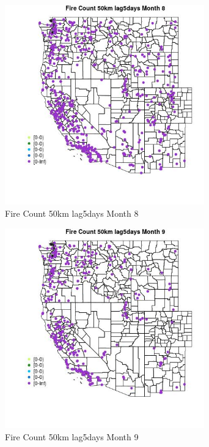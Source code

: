 \begin{figure} 
\centering  
\includegraphics[width=0.77\textwidth]{Code_Outputs/Report_ML_input_PM25_Step4_part_e_de_duplicated_aves_compiled_2019-05-18wNAs_MapObsMo8Fire_Count_50km_lag5days.jpg} 
\caption{\label{fig:Report_ML_input_PM25_Step4_part_e_de_duplicated_aves_compiled_2019-05-18wNAsMapObsMo8Fire_Count_50km_lag5days}Fire Count 50km lag5days Month 8} 
\end{figure} 
 

\begin{figure} 
\centering  
\includegraphics[width=0.77\textwidth]{Code_Outputs/Report_ML_input_PM25_Step4_part_e_de_duplicated_aves_compiled_2019-05-18wNAs_MapObsMo9Fire_Count_50km_lag5days.jpg} 
\caption{\label{fig:Report_ML_input_PM25_Step4_part_e_de_duplicated_aves_compiled_2019-05-18wNAsMapObsMo9Fire_Count_50km_lag5days}Fire Count 50km lag5days Month 9} 
\end{figure} 
 

